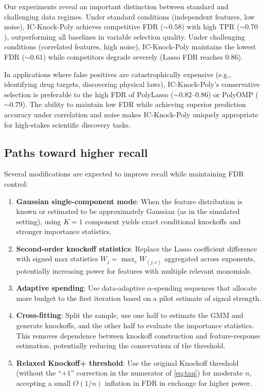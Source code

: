 \documentclass[11pt, a4paper]{article}
\begin{document}
Our experiments reveal an important distinction between standard and challenging
data regimes.  Under standard conditions (independent features, low noise),
IC-Knock-Poly achieves competitive FDR ($\sim 0.58$) with high TPR
($\sim 0.70$), outperforming all baselines in variable selection quality.
Under challenging conditions (correlated features, high noise), IC-Knock-Poly
maintains the lowest FDR ($\sim 0.61$) while competitors degrade severely
(Lasso FDR reaches 0.86).

In applications where false positives are catastrophically expensive (e.g.,
identifying drug targets, discovering physical laws), IC-Knock-Poly's
conservative selection is preferable to the high FDR of PolyLasso
($\sim 0.82$--$0.86$) or PolyOMP ($\sim 0.79$).  The ability to maintain
low FDR while achieving superior prediction accuracy under correlation and
noise makes IC-Knock-Poly uniquely appropriate for high-stakes scientific
discovery tasks.

\subsection{Paths toward higher recall}

Several modifications are expected to improve recall while maintaining FDR
control:

\begin{enumerate}
  \item \textbf{Gaussian single-component mode}: When the feature
    distribution is known or estimated to be approximately Gaussian (as in
    the simulated setting), using $K=1$ component yields exact conditional
    knockoffs and stronger importance statistics.
  \item \textbf{Second-order knockoff statistics}: Replace the Lasso
    coefficient difference with signed max statistics
    $W_j = \max_e W_{(j,e)}$ aggregated across exponents, potentially
    increasing power for features with multiple relevant monomials.
  \item \textbf{Adaptive spending}: Use data-adaptive $\alpha$-spending
    sequences that allocate more budget to the first iteration based on a
    pilot estimate of signal strength.
  \item \textbf{Cross-fitting}: Split the sample, use one half to estimate
    the GMM and generate knockoffs, and the other half to evaluate the
    importance statistics.  This removes dependence between knockoff
    construction and feature-response estimation, potentially reducing the
    conservatism of the threshold.
  \item \textbf{Relaxed Knockoff+ threshold}: Use the original Knockoff
    threshold (without the ``$+1$'' correction in the numerator of
    \eqref{eq:tau}) for moderate $n$, accepting a small $O(1/n)$ inflation
    in FDR in exchange for higher power.
\end{enumerate}
\end{document}
